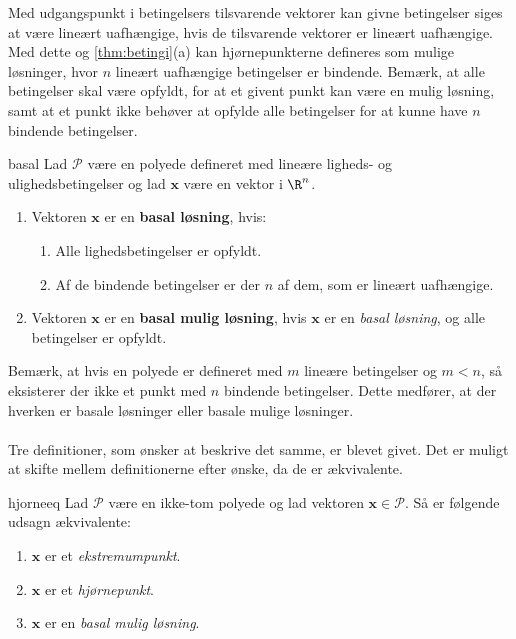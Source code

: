 %
Med udgangspunkt i betingelsers tilsvarende vektorer kan givne betingelser siges at være lineært uafhængige, hvis de tilsvarende vektorer er lineært uafhængige.
Med dette og \ref{thm:betingi}(a) kan hjørnepunkterne defineres som mulige løsninger, hvor $n$ lineært uafhængige betingelser er bindende.
Bemærk, at alle betingelser skal være opfyldt, for at et givent punkt kan være en mulig løsning, samt at et punkt ikke behøver at opfylde alle betingelser for at kunne have $n$ bindende betingelser.
%
\begin{defn}{}{basal}
Lad $\mathcal{P}$ være en polyede defineret med lineære ligheds- og ulighedsbetingelser og lad $\textbf{x}$ være en vektor i $\R^n$.
%
\begin{enumerate}[label=(\alph*)]
\item Vektoren $\textbf{x}$ er en \textbf{basal løsning}, hvis:
%
\begin{enumerate}[label=(\roman*)]
\item Alle lighedsbetingelser er opfyldt.
\item Af de bindende betingelser er der $n$ af dem, som er lineært uafhængige.
\end{enumerate}
%
\item Vektoren $\textbf{x}$ er en \textbf{basal mulig løsning}, hvis $\textbf{x}$ er en \textit{basal løsning}, og alle betingelser er opfyldt.
\end{enumerate}
\end{defn}\noindent
%
Bemærk, at hvis en polyede er defineret med $m$ lineære betingelser og $m<n$, så eksisterer der ikke et punkt med $n$ bindende betingelser.
Dette medfører, at der hverken er basale løsninger eller basale mulige løsninger.\\\\
%
%

%
Tre definitioner, som ønsker at beskrive det samme, er blevet givet.
Det er muligt at skifte mellem definitionerne efter ønske, da de er ækvivalente.
%
\begin{thm}{}{hjorneeq}
Lad $\mathcal{P}$ være en ikke-tom polyede og lad vektoren $\textbf{x}\in \mathcal{P}$.
Så er følgende udsagn ækvivalente:
%
\begin{enumerate}[label=(\alph*)]
\item $\textbf{x}$ er et \textit{ekstremumpunkt}.
\item $\textbf{x}$ er et \textit{hjørnepunkt}.
\item $\textbf{x}$ er en \textit{basal mulig løsning}.
\end{enumerate}
%
\end{thm}
